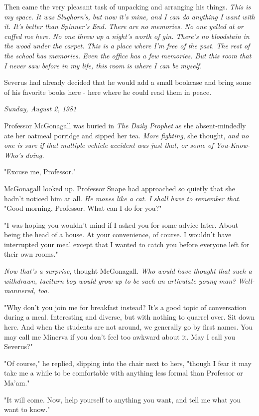 \documentclass[a4paper,11pt]{article}
\begin{document}
Then came the very pleasant task of unpacking and arranging his things. \emph{This is my space. It was Slughorn's, but now it's mine, and I can do anything I want with it. It's better than Spinner's End. There are no memories. No one yelled at or cuffed me here. No one threw up a night's worth of gin. There's no bloodstain in the wood under the carpet. This is a place where I'm free of the past. The rest of the school has memories. Even the office has a few memories. But this room that I never saw before in my life, this room is where I can be myself.}

Severus had already decided that he would add a small bookcase and bring some of his favorite books here - here where he could read them in peace.

\emph{Sunday, August 2, 1981}

Professor McGonagall was buried in \emph{The Daily Prophet} as she absent-mindedly ate her oatmeal porridge and sipped her tea. \emph{More fighting}, she thought, \emph{and no one is sure if that multiple vehicle accident was just that, or some of You-Know-Who's doing.}

"Excuse me, Professor."

McGonagall looked up. Professor Snape had approached so quietly that she hadn't noticed him at all. \emph{He moves like a cat. I shall have to remember that}. "Good morning, Professor. What can I do for you?"

"I was hoping you wouldn't mind if I asked you for some advice later. About being the head of a house. At your convenience, of course. I wouldn't have interrupted your meal except that I wanted to catch you before everyone left for their own rooms."

\emph{Now that's a surprise,} thought McGonagall. \emph{Who would have thought that such a withdrawn, taciturn boy would grow up to be such an articulate young man? Well-mannered, too.}

"Why don't you join me for breakfast instead? It's a good topic of conversation during a meal. Interesting and diverse, but with nothing to quarrel over. Sit down here. And when the students are not around, we generally go by first names. You may call me Minerva if you don't feel too awkward about it. May I call you Severus?"

"Of course," he replied, slipping into the chair next to hers, "though I fear it may take me a while to be comfortable with anything less formal than Professor or Ma'am."

"It will come. Now, help yourself to anything you want, and tell me what you want to know."
\end{document}
